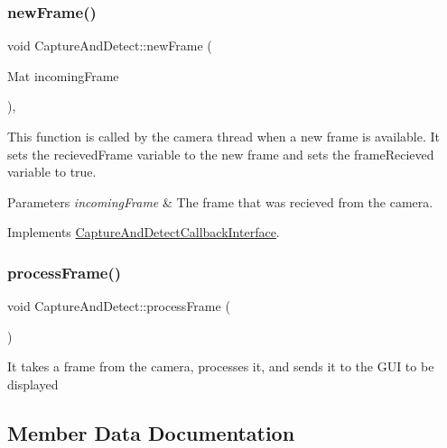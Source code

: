 \subsubsection{\texorpdfstring{new\+Frame()}{newFrame()}}
{\footnotesize\ttfamily void Capture\+And\+Detect\+::new\+Frame (\begin{DoxyParamCaption}\item[{Mat}]{incoming\+Frame }\end{DoxyParamCaption})\hspace{0.3cm}{\ttfamily [override]}, {\ttfamily [virtual]}}

This function is called by the camera thread when a new frame is available. It sets the recieved\+Frame variable to the new frame and sets the frame\+Recieved variable to true.


\begin{DoxyParams}{Parameters}
{\em incoming\+Frame} & The frame that was recieved from the camera. \\
\hline
\end{DoxyParams}


Implements \hyperlink{classCaptureAndDetectCallbackInterface_ae833754fc1c2bb1450e958ef619e9153}{Capture\+And\+Detect\+Callback\+Interface}.

\mbox{\label{classCaptureAndDetect_ac7e70bbcade4e0023541c556ee7cb34e}} 
\subsubsection{\texorpdfstring{process\+Frame()}{processFrame()}}
{\footnotesize\ttfamily void Capture\+And\+Detect\+::process\+Frame (\begin{DoxyParamCaption}{ }\end{DoxyParamCaption})}

It takes a frame from the camera, processes it, and sends it to the G\+UI to be displayed 

\subsection{Member Data Documentation}
\mbox{\label{classCaptureAndDetect_ae57b827ebac2b4d5f5baaa8935442183}} 
